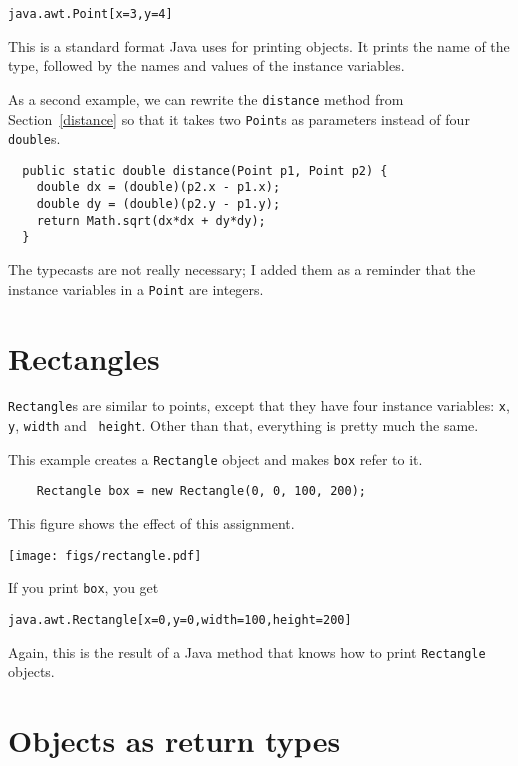 \documentclass[12pt]{book}
\theoremstyle{definition}
\begin{document}
\begin{lstlisting}
java.awt.Point[x=3,y=4]
\end{lstlisting}
% 
This is a standard format Java uses for printing objects.  It prints
the name of the type, followed by the names and values of the instance
variables.

As a second example, we can rewrite the {\tt distance} method from
Section~\ref{distance} so that it takes two {\tt Point}s as parameters
instead of four {\tt double}s.

\begin{lstlisting}
  public static double distance(Point p1, Point p2) {
    double dx = (double)(p2.x - p1.x);
    double dy = (double)(p2.y - p1.y);
    return Math.sqrt(dx*dx + dy*dy);
  }
\end{lstlisting}
%
The typecasts are not really necessary; I added them as a
reminder that the instance variables in a {\tt Point} are integers.


\section{Rectangles}

{\tt Rectangle}s are similar to points, except that they have four
instance variables: {\tt x}, {\tt y}, {\tt width} and {\tt
height}.  Other than that, everything is pretty much the same.

This example
creates a {\tt Rectangle} object and makes {\tt box} refer to it.

\begin{lstlisting}
    Rectangle box = new Rectangle(0, 0, 100, 200);
\end{lstlisting}
%
This figure shows the effect of this assignment.


\texttt{[image: figs/rectangle.pdf]}

If you print {\tt box}, you get

\begin{lstlisting}
java.awt.Rectangle[x=0,y=0,width=100,height=200]
\end{lstlisting}
%
Again, this is the result of a Java method that knows how
to print {\tt Rectangle} objects.


\section{Objects as return types}
\end{document}
